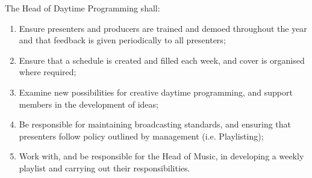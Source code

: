 \item The Head of Daytime Programming shall:
\begin{enumerate}[label*=\arabic*.]
    \item Ensure presenters and producers are trained and demoed throughout the year and that feedback is given periodically to all presenters;
    \item Ensure that a schedule is created and filled each week, and cover is organised where required;
    \item Examine new possibilities for creative daytime programming, and support members in the development of ideas;
    \item Be responsible for maintaining broadcasting standards, and ensuring that presenters follow policy outlined by management (i.e. Playlisting);
    \item Work with, and be responsible for the Head of Music, in developing a weekly playlist and carrying out their responsibilities.
\end{enumerate}
